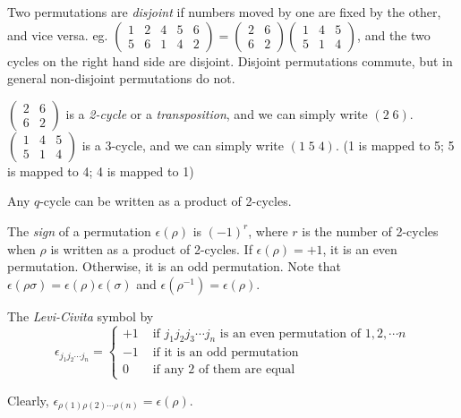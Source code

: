 \documentclass[a4paper]{article}
\begin{document}
\begin{defi}
  Two permutations are \emph{disjoint} if numbers moved by one are fixed by the other, and vice versa.  eg. $\begin{pmatrix} 1 & 2 & 4 & 5 & 6\\ 5 & 6 & 1 & 4 & 2\end{pmatrix} = \begin{pmatrix}2 & 6\\ 6& 2\end{pmatrix}\begin{pmatrix}1 & 4 & 5\\5 & 1 & 4\end{pmatrix}$, and the two cycles on the right hand side are disjoint. Disjoint permutations commute, but in general non-disjoint permutations do not.
\end{defi}

\begin{defi}
  $\begin{pmatrix} 2 & 6 \\ 6 & 2\end{pmatrix}$ is a \emph{2-cycle} or a \emph{transposition}, and we can simply write $(2\; 6)$. $\begin{pmatrix}1 & 4 & 5\\5 & 1 & 4\end{pmatrix}$ is a 3-cycle, and we can simply write $(1\; 5\; 4)$. (1 is mapped to 5; 5 is mapped to 4; 4 is mapped to 1)
\end{defi}

\begin{prop}
  Any $q$-cycle can be written as a product of 2-cycles.
\end{prop}

\begin{defi}
  The \emph{sign} of a permutation $\epsilon(\rho)$ is $(-1)^r$, where $r$ is the number of 2-cycles when $\rho$ is written as a product of 2-cycles. If $\epsilon(\rho) = +1$, it is an even permutation. Otherwise, it is an odd permutation. Note that $\epsilon(\rho\sigma) = \epsilon(\rho)\epsilon(\sigma)$ and $\epsilon(\rho^{-1}) = \epsilon(\rho)$.
\end{defi}

\begin{defi}
  The \emph{Levi-Civita} symbol by
  \[
    \epsilon_{j_1j_2\cdots j_n} = \begin{cases}+1 & \text{ if } j_1j_2j_3\cdots j_n\text{ is an even permutation of }1, 2, \cdots n\\
      -1 & \text{ if it is an odd permutation}\\
      0 & \text{ if any 2 of them are equal}
    \end{cases}
  \]

  Clearly, $\epsilon_{\rho(1)\rho(2)\cdots \rho(n)} = \epsilon(\rho)$.
\end{defi}
\end{document}
